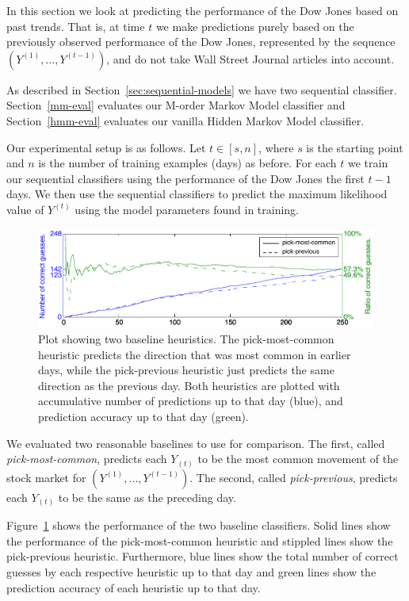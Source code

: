 \documentclass[10pt, twocolumn]{article}
\begin{document}
In this section we look at predicting the performance of the Dow Jones based on past trends.
That is, at time $t$ we make predictions purely based on the previously observed performance of the Dow Jones, represented by the sequence $(Y^{(1)}, ..., Y^{(t-1)})$, and do not take Wall Street Journal articles into account.

As described in Section~\ref{sec:sequential-models} we have two sequential classifier.
Section~\ref{mm-eval} evaluates our M-order Markov Model classifier and Section~\ref{hmm-eval} evaluates our vanilla Hidden Markov Model classifier.

Our experimental setup is as follows.
Let $t\in{}[s,n]$, where $s$ is the starting point and $n$ is the number of training examples (days) as before.
For each $t$ we train our sequential classifiers using the performance of the Dow Jones the first $t-1$ days.
We then use the sequential classifiers to predict the maximum likelihood value of $Y^{(t)}$ using the model parameters found in training.

\begin{figure}
\center
\hspace{0.5cm}
\includegraphics[width=16cm]{experiments/seq_baseline.pdf}
\caption{Plot showing two baseline heuristics. The pick-most-common heuristic predicts the direction that was most common in earlier days, while the pick-previous heuristic just predicts the same direction as the previous day. Both heuristics are plotted with accumulative number of predictions up to that day (blue), and prediction accuracy up to that day (green).}
\label{fig:seq-baseline}
\end{figure}

We evaluated two reasonable baselines to use for comparison.
The first, called \emph{pick-most-common}, predicts each $Y_{(t)}$ to be the most common movement of the stock market for $(Y^{(1)}, ..., Y^{(t-1)})$.
The second, called \emph{pick-previous}, predicts each $Y_{(t)}$ to be the same as the preceding day.

Figure~\ref{fig:seq-baseline} shows the performance of the two baseline classifiers.
Solid lines show the performance of the pick-most-common heuristic and stippled lines show the pick-previous heuristic.
Furthermore, blue lines show the total number of correct guesses by each respective heuristic up to that day and green lines show the prediction accuracy of each heuristic up to that day.
\end{document}
